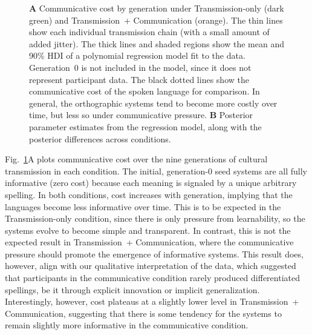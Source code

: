 \documentclass[doc,biblatex]{apa7}
\begin{document}
	\begin{figure}
	\vspace*{2pt}
	\caption{\textbf{A} Communicative cost by generation under Transmission-only (dark green) and Transmission~+ Communication (orange). The thin lines show each individual transmission chain (with a small amount of added jitter). The thick lines and shaded regions show the mean and 90\% HDI of a polynomial regression model fit to the data. Generation~0 is not included in the model, since it does not represent participant data. The black dotted lines show the communicative cost of the spoken language for comparison. In general, the orthographic systems tend to become more costly over time, but less so under communicative pressure. \textbf{B} Posterior parameter estimates from the regression model, along with the posterior differences across conditions.}
	\label{cost_dif}
	\end{figure}

Fig.~\ref{cost_dif}A plots communicative cost over the nine generations of cultural transmission in each condition. The initial, generation-0 seed systems are all fully informative (zero cost) because each meaning is signaled by a unique arbitrary spelling. In both conditions, cost increases with generation, implying that the languages become less informative over time. This is to be expected in the Transmission-only condition, since there is only pressure from learnability, so the systems evolve to become simple and transparent. In contrast, this is not the expected result in Transmission~+ Communication, where the communicative pressure should promote the emergence of informative systems. This result does, however, align with our qualitative interpretation of the data, which suggested that participants in the communicative condition rarely produced differentiated spellings, be it through explicit innovation or implicit generalization. Interestingly, however, cost plateaus at a slightly lower level in Transmission~+ Communication, suggesting that there is some tendency for the systems to remain slightly more informative in the communicative condition.
\end{document}

